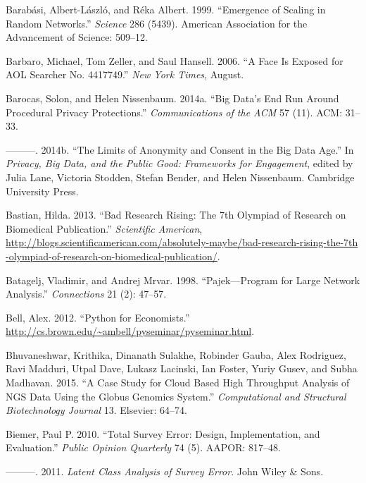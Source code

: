 \documentclass[]{krantz}
\begin{document}
\hypertarget{ref-barabasi1999emergence}{}
Barabási, Albert-László, and Réka Albert. 1999. ``Emergence of Scaling
in Random Networks.'' \emph{Science} 286 (5439). American Association
for the Advancement of Science: 509--12.

\hypertarget{ref-barbaro2006face}{}
Barbaro, Michael, Tom Zeller, and Saul Hansell. 2006. ``A Face Is
Exposed for AOL Searcher No. 4417749.'' \emph{New York Times}, August.

\hypertarget{ref-barocas2014big}{}
Barocas, Solon, and Helen Nissenbaum. 2014a. ``Big Data's End Run Around
Procedural Privacy Protections.'' \emph{Communications of the ACM} 57
(11). ACM: 31--33.

\hypertarget{ref-barocas2014bigger}{}
---------. 2014b. ``The Limits of Anonymity and Consent in the Big Data
Age.'' In \emph{Privacy, Big Data, and the Public Good: Frameworks for
Engagement}, edited by Julia Lane, Victoria Stodden, Stefan Bender, and
Helen Nissenbaum. Cambridge University Press.

\hypertarget{ref-Bastian2013}{}
Bastian, Hilda. 2013. ``Bad Research Rising: The 7th Olympiad of
Research on Biomedical Publication.'' \emph{Scientific American},
\url{http://blogs.scientificamerican.com/absolutely-maybe/bad-research-rising-the-7th}
\url{-olympiad-of-research-on-biomedical-publication/}.

\hypertarget{ref-batagelj1998pajek}{}
Batagelj, Vladimir, and Andrej Mrvar. 1998. ``Pajek---Program for Large
Network Analysis.'' \emph{Connections} 21 (2): 47--57.

\hypertarget{ref-BellPython}{}
Bell, Alex. 2012. ``Python for Economists.''
\url{http://cs.brown.edu/~ambell/pyseminar/pyseminar.html}.

\hypertarget{ref-bhuvaneshwar2015case}{}
Bhuvaneshwar, Krithika, Dinanath Sulakhe, Robinder Gauba, Alex
Rodriguez, Ravi Madduri, Utpal Dave, Lukasz Lacinski, Ian Foster, Yuriy
Gusev, and Subha Madhavan. 2015. ``A Case Study for Cloud Based High
Throughput Analysis of NGS Data Using the Globus Genomics System.''
\emph{Computational and Structural Biotechnology Journal} 13. Elsevier:
64--74.

\hypertarget{ref-biemer2010total}{}
Biemer, Paul P. 2010. ``Total Survey Error: Design, Implementation, and
Evaluation.'' \emph{Public Opinion Quarterly} 74 (5). AAPOR: 817--48.

\hypertarget{ref-biemer2011latent}{}
---------. 2011. \emph{Latent Class Analysis of Survey Error}. John
Wiley \& Sons.
\end{document}
